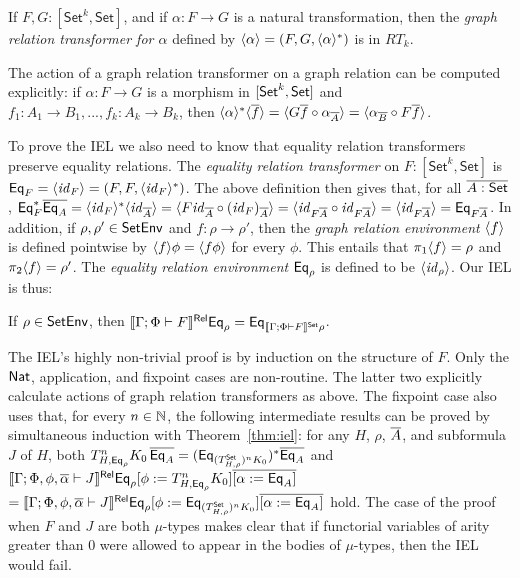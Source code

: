 \documentclass[runningheads]{llncs}
\newcommand{\set}{\mathsf{Set}}
\renewcommand{\id}{\mathit{id}}
\renewcommand{\id}{\mathit{id}}
\begin{document}
\begin{lemma}\label{lem:graph-reln-functors}
If $F,G : [\set^k,\set]$, and if $\alpha : F \to G$ is a natural
transformation, then the {\em graph relation transformer for $\alpha$}
defined by $\langle {\alpha} \rangle = (F, G, \langle {\alpha} \rangle^*)$ is in $RT_k$.
\end{lemma}

\noindent
The action of a graph relation transformer on a graph relation can be
computed explicitly:
if $\alpha : F \to G$ is a morphism in $[\mathsf{Set}^k, \mathsf{Set}]$
and $f_1: A_1 \to B_1, ..., f_k : A_k \to B_k$,
then $\langle {\alpha} \rangle^* \langle {\overline{f}} \rangle
= \langle G \overline{f} \circ \alpha_{\overline{A}} \rangle
= \langle \alpha_{\overline{B}} \circ F \overline{f} \rangle$.

To prove the IEL we also need to know that equality relation
transformers preserve equality relations. The {\em equality relation
  transformer} on $F : [\set^k,\set]$ is $\Eq_F = \graph{\id_{F}} =
(F, F, \graph{\id_{F}}^*)$.
The above definition then gives that, for all $\ol{A : \set}$,
$\Eq^*_F \ol{\Eq_A}
= \graph{\id_F}^* \graph{\id_{\ol{A}}}
= \graph{F \id_{\ol{A}} \circ (\id_F)_{\ol{A}}}
= \graph{\id_{F\ol{A}} \circ \id_{F\ol{A}}}
= \graph{\id_{F\ol{A}}}
= \Eq_{F\ol{A}}$. In addition,
if $\rho, \rho' \in \mathsf{SetEnv}$ and $f : \rho \to \rho'$, then
the {\em graph relation environment} $\langle {f} \rangle$ is defined pointwise
by $\langle {f} \rangle \phi = \langle {f \phi} \rangle$ for every $\phi$. This entails
that $\pi_1 \langle {f} \rangle = \rho$ and $\pi_2 \langle {f} \rangle = \rho'$.  The {\em
  equality relation environment} $\mathsf{Eq}_\rho$ is defined to be
$\graph{\id_{\rho}}$. Our IEL is thus:
\begin{theorem}[IEL]\label{thm:iel}
    If $\rho \in \mathsf{SetEnv}$, then
  $\relsem{\Gamma; \Phi \vdash F} \Eq_\rho = \Eq_{\setsem{\Gamma;
      \Phi \vdash F}\rho}$.
\end{theorem}
The IEL's highly non-trivial proof is by induction on the structure of
$F$. Only the $\mathsf{Nat}$, application, and fixpoint cases are
non-routine. The latter two explicitly calculate actions of graph
relation transformers as above.  The fixpoint case also uses that, for
every $n \in \mathbb{N}$, the following intermediate results can be proved
by simultaneous induction with Theorem~\ref{thm:iel}: for any $H$,
$\rho$, $\overline{A}$, and subformula $J$ of $H$, both $T^n_{H,\Eq_{\rho}}
K_0\, \ol{\Eq_A} = (\Eq_{(T^\set_{H,\rho})^n K_0})^* \ol{\Eq_A}$\; and
$ \llbracket{\Gamma; \Phi, \phi, \overline{\alpha} \vdash J}\rrbracket^{\mathsf{Rel}} \mathsf{Eq}_{\rho} [\phi
  := T^{n}_{H,\mathsf{Eq}_{\rho}} K_0] \overline{[\alpha := \mathsf{Eq}_A]}$ $=
\relsem{\Gamma; \Phi, \phi, \ol{\alpha} \vdash J} \Eq_{\rho}[\phi :=
  \Eq_{(T^\set_{H,\rho})^n K_0}] \overline{[\alpha := \Eq_A]}$
hold. The case of the proof when $F$ and $J$ are both $\mu$-types
makes clear that if functorial variables of arity greater than $0$
were allowed to appear in the bodies of $\mu$-types, then the IEL
would fail.
\end{document}

